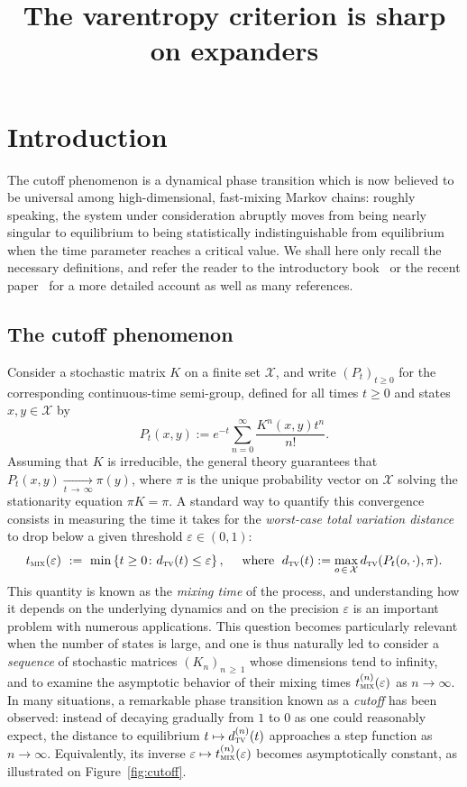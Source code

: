 \documentclass[AHL,Unicode,longabstracts,published]{cedram}
\title{The varentropy criterion is sharp on expanders}
\author{\firstname{Justin} \lastname{Salez}}
\newcommand{\cX}{\mathcal{X}}
\newcommand{\dtv}{d_{\textsc{tv}}}
\newcommand{\tmix}{t_{\textsc{mix}}}
\begin{document}
\maketitle

\section{Introduction}

The cutoff phenomenon is a dynamical phase transition which is now believed to be universal among high-dimensional, fast-mixing Markov chains: roughly speaking, the system under consideration abruptly moves from being nearly singular to equilibrium to being statistically indistinguishable from equilibrium when the time parameter reaches a critical value. We shall here only recall the necessary definitions, and refer the reader to the introductory book~\cite[Chapter~18]{MR3726904} or the recent paper~\cite{arxiv.2102.05597} for a more detailed account as well as many references.

\subsection{The cutoff phenomenon}

Consider a stochastic matrix $K$ on a finite set $\cX$, and write $(P_t)_{t\ge 0}$ for the corresponding continuous-time semi-group, defined for all times $t\ge 0$ and states $x,y\in\cX$ by
\[
P_t(x,y) := e^{-t}\sum_{n=0}^\infty \frac{K^n(x,y)t^n}{n!}.
\]
Assuming that $K$ is irreducible, the general theory guarantees that $P_t(x,y)\xrightarrow[t\,\to\,\infty]{}\pi(y)$, where $\pi$ is the unique probability vector on $\cX$ solving the stationarity equation $\pi K=\pi$. A standard way to quantify this convergence consists in measuring the time it takes for the \emph{worst-case total variation distance} to drop below a given threshold $\varepsilon\in(0,1)$:
\[
\tmix(\varepsilon) \ := \ \min\left\{t\ge 0\colon \dtv(t)\le\varepsilon\right\},\quad \text{ where }\; \dtv(t) := \max_{o\,\in\,\cX}\dtv(P_t(o,\cdot),\pi).
\]
This quantity is known as the \emph{mixing time} of the process, and understanding how it depends on the underlying dynamics and on the precision $\varepsilon$ is an important problem with numerous applications. This question becomes particularly relevant when the number of states is large, and one is thus naturally led to consider a \emph{sequence} of stochastic matrices $(K_n)_{n\,\ge\,1}$ whose dimensions tend to infinity, and to examine the asymptotic behavior of their mixing times $\tmix^{(n)}(\varepsilon)$ as $n\to\infty$. In many situations, a remarkable phase transition known as a \emph{cutoff} has been observed: instead of decaying gradually from $1$ to $0$ as one could reasonably expect, the distance to equilibrium $t\mapsto\dtv^{(n)}(t)$ approaches a step function as $n\to\infty$. Equivalently, its inverse $\varepsilon\mapsto \tmix^{(n)}(\varepsilon)$ becomes asymptotically constant, as illustrated on Figure~\ref{fig:cutoff}.
\end{document}
